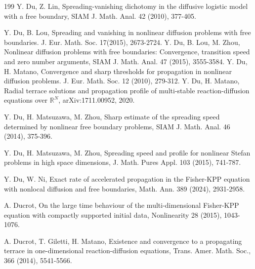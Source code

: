 \documentclass[11pt]{amsart}
\numberwithin{equation}{section}
\begin{document}
\begin{thebibliography}{199}
  Y. Du, Z. Lin, Spreading-vanishing dichotomy in the diffusive logistic model with a free boundary, SIAM J. Math. Anal. 42 (2010), 377-405.

  Y. Du, B. Lou, Spreading and vanishing in nonlinear diffusion problems with free boundaries. J. Eur. Math. Soc. 17(2015), 2673-2724.
 Y. Du, B. Lou, M. Zhou, Nonlinear diffusion problems with free boundaries: Convergence, transition speed and zero number arguments, SIAM J. Math. Anal. 47 (2015), 3555-3584.
  Y. Du,  H. Matano, Convergence and sharp thresholds for propagation in nonlinear diffusion problems.
J. Eur. Math. Soc. 12 (2010), 279-312.
 Y. Du, H. Matano,
 Radial terrace solutions and propagation profile of multi-stable reaction-diffusion equations over $\mathbb{R}^N$,
 arXiv:1711.00952, 2020.

 Y. Du, H. Matsuzawa, M. Zhou, Sharp estimate of the spreading speed determined by nonlinear free boundary problems, SIAM J. Math. Anal. 46 (2014), 375-396.

 Y. Du, H. Matsuzawa, M. Zhou, Spreading speed and profile for nonlinear Stefan problems in high space dimensions, J. Math. Pures Appl. 103 (2015), 741-787.

 Y. Du, W. Ni, Exact rate of accelerated propagation in the Fisher-KPP equation with nonlocal diffusion and free boundaries,
Math. Ann. 389 (2024), 2931-2958.




A. Ducrot, On the large time behaviour of the multi-dimensional Fisher-KPP equation with compactly supported initial data, Nonlinearity 28 (2015),  1043-1076.


 A. Ducrot, T. Giletti,  H. Matano, Existence and convergence to a propagating terrace in one-dimensional reaction-diffusion equations, Trans. Amer. Math. Soc., 366 (2014), 5541-5566.


\end{thebibliography}
\end{document}
